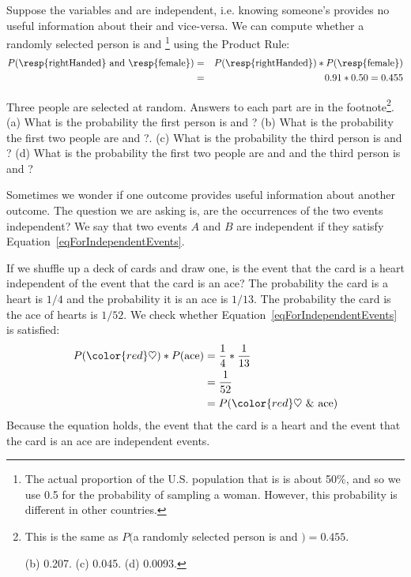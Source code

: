 Suppose the variables  and  are independent, i.e. knowing someone's  provides no useful information about their  and vice-versa. We can compute whether a randomly selected person is  and \footnote{The actual proportion of the U.S. population that is  is about 50\%, and so we use 0.5 for the probability of sampling a woman. However, this probability is different in other countries.} using the Product Rule:
\begin{eqnarray*}
P(\text{\resp{rightHanded} and \resp{female}}) &=& P(\text{\resp{rightHanded}}) * P(\text{\resp{female}}) \\
&=& 0.91 * 0.50 = 0.455
\end{eqnarray*}


\begin{exercise}
Three people are selected at random. Answers to each part are in the footnote\footnote{This is the same as $P($a randomly selected person is  and $)=0.455$. \par \hspace{3mm} (b) 0.207. (c) 0.045. (d) 0.0093.}. (a) What is the probability the first person is  and ? (b) What is the probability the first two people are  and ?. (c) What is the probability the third person is  and ? (d) What is the probability the first two people are  and  and the third person is  and ?
\end{exercise}

Sometimes we wonder if one outcome provides useful information about another outcome. The question we are asking is, are the occurrences of the two events independent? We say that two events $A$ and $B$ are independent if they satisfy Equation~\eqref{eqForIndependentEvents}.

\begin{example}{If we shuffle up a deck of cards and draw one, is the event that the card is a heart independent of the event that the card is an ace?}
The probability the card is a heart is $1/4$ and the probability it is an ace is $1/13$. The probability the card is the ace of hearts is $1/52$. We check whether Equation~\ref{eqForIndependentEvents} is satisfied:
\begin{align*}
P({\color{red}\heartsuit})*P(\text{ace}) &= \frac{1}{4}*\frac{1}{13} \\
					&= \frac{1}{52} \\
					&= P({\color{red}\heartsuit}\text{ \& ace})
\end{align*}
Because the equation holds, the event that the card is a heart and the event that the card is an ace are independent events.
\end{example}

